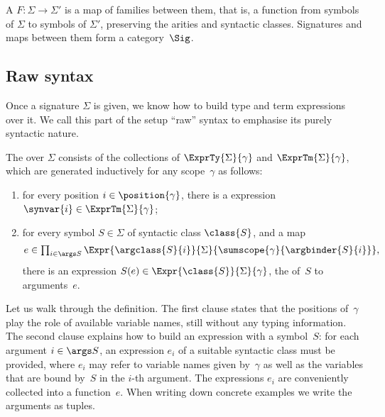 \begin{definition}
  \label{def:signature-map}%
  A  $F : \Sigma \to \Sigma'$ is a map of families between them, that is, a function from symbols of $\Sigma$ to symbols of $\Sigma'$, preserving the arities and syntactic classes.
  Signatures and maps between them form a category~$\Sig$.
\end{definition}

\subsection{Raw syntax}

Once a signature $\Sigma$ is given, we know how to build type and term expressions over it. We call this part of the setup ``raw'' syntax to emphasise its purely syntactic nature.

\begin{definition}
  \label{def:raw-syntax}%
  The  over $\Sigma$ consists of the collections of  $\ExprTy{\Sigma}{\gamma}$ and  $\ExprTm{\Sigma}{\gamma}$, which are generated inductively for any scope~$\gamma$ as follows:
  \begin{enumerate}
  \item for every position $i \in \position{\gamma}$, there is a  expression $\synvar{i} \in \ExprTm{\Sigma}{\gamma}$;
  \item for every symbol $S \in \Sigma$ of syntactic class $\class{S}$, and a map
    \begin{equation*}
      \textstyle
      e \in \prod_{i \in \args S} \Expr{\argclass{S}{i}}{\Sigma}{\sumscope{\gamma}{\argbinder{S}{i}}},
    \end{equation*}
    there is an expression $S(e) \in \Expr{\class{S}}{\Sigma}{\gamma}$, the  of~$S$ to arguments~$e$.
  \end{enumerate}
\end{definition}

Let us walk through the definition.
%
The first clause states that the positions of~$\gamma$ play the role of available variable names, still without any typing information.
%
The second clause explains how to build an expression with a symbol~$S$: for each argument $i \in \args S$, an expression $e_i$ of a suitable syntactic class must be provided, where $e_i$ may refer to variable names given by~$\gamma$ as well as the variables that are bound by~$S$ in the $i$-th argument.
%
The expressions $e_i$ are conveniently collected into a function~$e$.
%
When writing down concrete examples we write the arguments as tuples.

